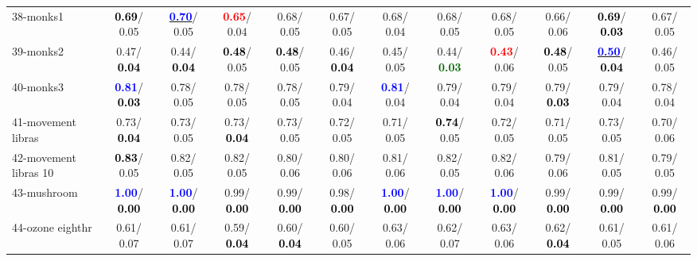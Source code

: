 \begin{table}[h]
\begin{center}
{\begin{tabular}{lc|c|c|c|c|c|c|c|c|c|c}
38-monks1 & \textcolor{black}{\textbf{  0.69}}/  0.05 & \underline{\textcolor{blue}{\textbf{  0.70}}}/  0.05 & \textcolor{red}{\textbf{  0.65}}/  0.04 &   0.68/  0.05 &   0.67/  0.05 &   0.68/  0.04 &   0.68/  0.05 &   0.68/  0.05 &   0.66/  0.06 & \textcolor{black}{\textbf{  0.69}}/\textcolor{black}{\textbf{  0.03}} &   0.67/  0.05 \\
39-monks2 &   0.47/\textcolor{black}{\textbf{  0.04}} &   0.44/\textcolor{black}{\textbf{  0.04}} & \textcolor{black}{\textbf{  0.48}}/  0.05 & \textcolor{black}{\textbf{  0.48}}/  0.05 &   0.46/\textcolor{black}{\textbf{  0.04}} &   0.45/  0.05 &   0.44/\textcolor{darkgreen}{\textbf{  0.03}} & \textcolor{red}{\textbf{  0.43}}/  0.06 & \textcolor{black}{\textbf{  0.48}}/  0.05 & \underline{\textcolor{blue}{\textbf{  0.50}}}/\textcolor{black}{\textbf{  0.04}} &   0.46/  0.05 \\ \hline
40-monks3 & \textcolor{blue}{\textbf{  0.81}}/\textcolor{black}{\textbf{  0.03}} &   0.78/  0.05 &   0.78/  0.05 &   0.78/  0.05 &   0.79/  0.04 & \textcolor{blue}{\textbf{  0.81}}/  0.04 &   0.79/  0.04 &   0.79/  0.04 &   0.79/\textcolor{black}{\textbf{  0.03}} &   0.79/  0.04 &   0.78/  0.04 \\
41-movement libras &   0.73/\textcolor{black}{\textbf{  0.04}} &   0.73/  0.05 &   0.73/\textcolor{black}{\textbf{  0.04}} &   0.73/  0.05 &   0.72/  0.05 &   0.71/  0.05 & \textcolor{black}{\textbf{  0.74}}/  0.05 &   0.72/  0.05 &   0.71/  0.05 &   0.73/  0.05 &   0.70/  0.06 \\
42-movement libras 10 & \textcolor{black}{\textbf{  0.83}}/  0.05 &   0.82/  0.05 &   0.82/  0.05 &   0.80/  0.06 &   0.80/  0.06 &   0.81/  0.06 &   0.82/  0.05 &   0.82/  0.06 &   0.79/  0.06 &   0.81/  0.05 &   0.79/  0.05 \\
43-mushroom & \textcolor{blue}{\textbf{  1.00}}/\textcolor{black}{\textbf{  0.00}} & \textcolor{blue}{\textbf{  1.00}}/\textcolor{black}{\textbf{  0.00}} &   0.99/\textcolor{black}{\textbf{  0.00}} &   0.99/\textcolor{black}{\textbf{  0.00}} &   0.98/\textcolor{black}{\textbf{  0.00}} & \textcolor{blue}{\textbf{  1.00}}/\textcolor{black}{\textbf{  0.00}} & \textcolor{blue}{\textbf{  1.00}}/\textcolor{black}{\textbf{  0.00}} & \textcolor{blue}{\textbf{  1.00}}/\textcolor{black}{\textbf{  0.00}} &   0.99/\textcolor{black}{\textbf{  0.00}} &   0.99/\textcolor{black}{\textbf{  0.00}} &   0.99/\textcolor{black}{\textbf{  0.00}} \\
44-ozone eighthr &   0.61/  0.07 &   0.61/  0.07 &   0.59/\textcolor{black}{\textbf{  0.04}} &   0.60/\textcolor{black}{\textbf{  0.04}} &   0.60/  0.05 &   0.63/  0.06 &   0.62/  0.07 &   0.63/  0.06 &   0.62/\textcolor{black}{\textbf{  0.04}} &   0.61/  0.05 &   0.61/  0.06 \\

\end{tabular}}
\end{center}
\end{table}
